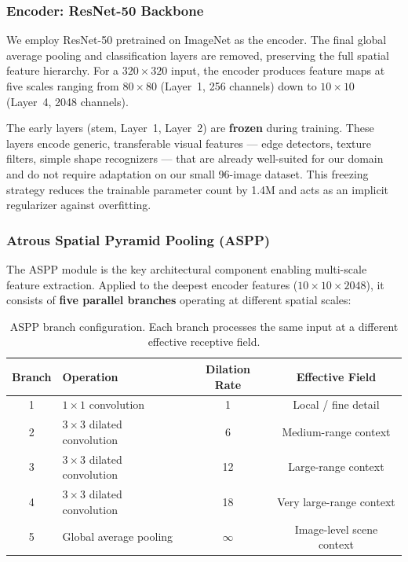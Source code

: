 \documentclass[12pt, a4paper]{article}
\begin{document}
\subsubsection{Encoder: ResNet-50 Backbone}

We employ ResNet-50 pretrained on ImageNet as the encoder. The final global average pooling and classification layers are removed, preserving the full spatial feature hierarchy. For a $320 \times 320$ input, the encoder produces feature maps at five scales ranging from $80 \times 80$ (Layer~1, 256 channels) down to $10 \times 10$ (Layer~4, 2048 channels).

The early layers (stem, Layer~1, Layer~2) are \textbf{frozen} during training. These layers encode generic, transferable visual features — edge detectors, texture filters, simple shape recognizers — that are already well-suited for our domain and do not require adaptation on our small 96-image dataset. This freezing strategy reduces the trainable parameter count by 1.4M and acts as an implicit regularizer against overfitting.

\subsubsection{Atrous Spatial Pyramid Pooling (ASPP)}

The ASPP module is the key architectural component enabling multi-scale feature extraction. Applied to the deepest encoder features ($10 \times 10 \times 2048$), it consists of \textbf{five parallel branches} operating at different spatial scales:

\begin{table}[H]
\centering
\caption{ASPP branch configuration. Each branch processes the same input at a different effective receptive field.}
\label{tab:aspp}
\begin{tabular}{@{}clcc@{}}
\toprule
\textbf{Branch} & \textbf{Operation} & \textbf{Dilation Rate} & \textbf{Effective Field} \\
\midrule
1 & $1 \times 1$ convolution      & 1  & Local / fine detail \\
2 & $3 \times 3$ dilated convolution & 6  & Medium-range context \\
3 & $3 \times 3$ dilated convolution & 12 & Large-range context \\
4 & $3 \times 3$ dilated convolution & 18 & Very large-range context \\
5 & Global average pooling         & $\infty$ & Image-level scene context \\
\bottomrule
\end{tabular}
\end{table}
\end{document}
